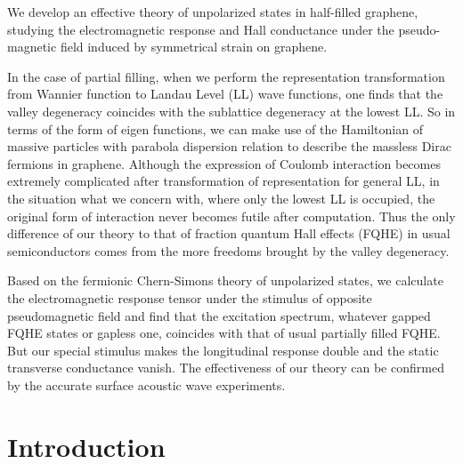 \documentclass[bachelor,english,numbers]{ustcthesis}
\begin{document}
\begin{enabstract}

	We develop an effective theory of unpolarized states in half-filled graphene, studying the electromagnetic response and Hall conductance under the pseudo-magnetic field induced by symmetrical strain on graphene.\par

	In the case of partial filling, when we perform the representation transformation from Wannier function to Landau Level (LL) wave functions, one finds that the valley degeneracy coincides with the sublattice degeneracy at the lowest LL. So in terms of the form of eigen functions, we can make use of the Hamiltonian of massive particles with parabola dispersion relation to describe the massless Dirac fermions in graphene. Although the expression of Coulomb interaction becomes extremely complicated after transformation of representation for general LL, in the situation what we concern with, where only the lowest LL is occupied, the original form of interaction never becomes futile after computation. Thus the only difference of our theory to that of fraction quantum Hall effects (FQHE) in usual semiconductors comes from the more freedoms brought by the valley degeneracy.\par

	Based on the fermionic Chern-Simons theory of unpolarized states, we calculate the electromagnetic response tensor under the stimulus of opposite pseudomagnetic field and find that the excitation spectrum, whatever gapped FQHE states or gapless one, coincides with that of usual partially filled FQHE. But our special stimulus makes the longitudinal response double and the static transverse conductance vanish. The effectiveness of our theory can be confirmed by the accurate surface acoustic wave experiments.  

\end{enabstract}


\mainmatter

\chapter{Introduction}
\end{document}
